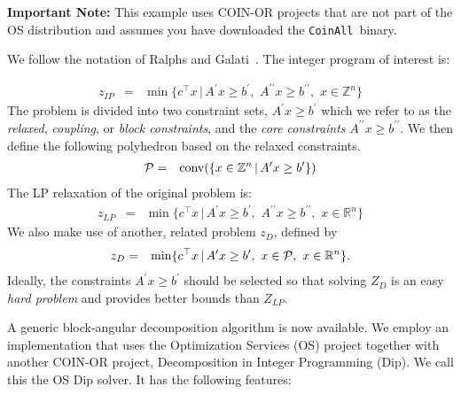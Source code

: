 \label{section:OSDip}

{\bf Important Note:}  This example uses COIN-OR projects that are not part of the OS distribution and
assumes you have downloaded the {\tt CoinAll }binary.

We follow the notation of Ralphs and Galati~\cite{ralphsgalatiMP}. The integer program of interest is:

\begin{eqnarray}
z_{IP} &=&  \min  \{c^{\top} x \, | \, A^{\prime} x \ge b^{\prime},  \,\, 
A^{\prime \prime} x \ge b^{\prime \prime}, \, \, x \in \mathbb{Z}^{n}  \}
\end{eqnarray}
The problem is divided into two constraint sets, $A^{\prime} x \ge b^{\prime}$
which we refer to as the {\it relaxed}, {\it coupling}, or {\it block constraints}, and the {\it core
constraints} $A^{\prime \prime} x \ge b^{\prime \prime}$.  We then define the
following polyhedron based on the relaxed constraints.
\begin{eqnarray}
{\cal P} &=&  {\rm conv} ( \{ x \in \mathbb{Z}^{n} \, | \, A^{\prime} x \ge
b^{\prime}
\})
\end{eqnarray}
 The LP relaxation of the original problem is:
\begin{eqnarray}
z_{LP} &=&  \min  \{c^{\top} x \, | \, A^{\prime} x \ge b^{\prime},  \,\, 
A^{\prime \prime} x \ge b^{\prime \prime}, \, \, x \in \mathbb{R}^{n} \}
\end{eqnarray}
We also make use of another, related problem $z_D$, defined by
\begin{eqnarray}
z_{D} &=&  \min \{c^{\top} x \, | \, A^{\prime} x \ge b^{\prime},  \,\, 
x \in {\cal P}, \, \, x \in \mathbb{R}^{n} \}.
\end{eqnarray}
Ideally,  the constraints $A^{\prime} x \ge b^{\prime}$
should be selected so that solving $Z_{D}$ is an easy {\it hard problem} and
provides better bounds than $Z_{LP}.$

A generic block-angular decomposition algorithm is now available. 
We employ an implementation that uses the Optimization Services (OS) project together with
another COIN-OR project, Decomposition in Integer Programming (Dip).
We call this the OS Dip solver.  It has the following features:

